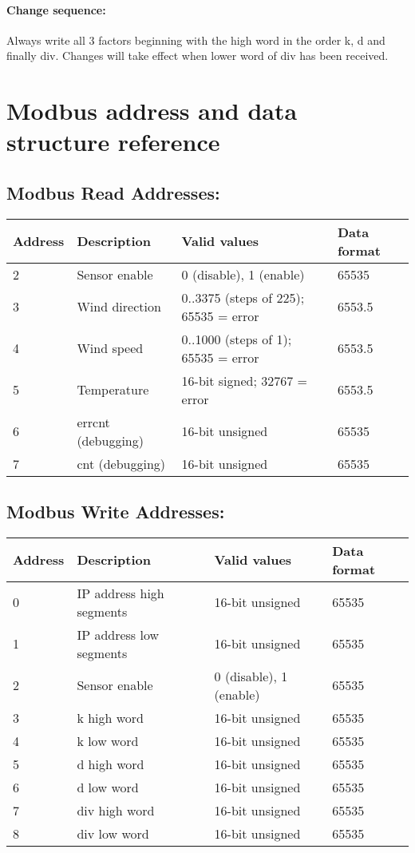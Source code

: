 \paragraph{Change sequence: }Always write all 3 factors beginning with the high word in the order k, d and finally div. Changes will take effect when lower word of div has been received.

\section{Modbus address and data structure reference}
\label{sec:modbus_address_ref}
\subsection{Modbus Read Addresses:}

\begin{tabular}{|l|l|l|l|}
\hline \textbf{Address} & \textbf{Description} & \textbf{Valid values} & \textbf{Data format} \\ 
\hline
\hline 2 & Sensor enable & 0 (disable), 1 (enable) & 65535 \\ 
\hline 3 & Wind direction & 0..3375 (steps of 225); 65535 = error & 6553.5 \\ 
\hline 4 & Wind speed & 0..1000 (steps of 1); 65535 = error & 6553.5 \\ 
\hline 5 & Temperature & 16-bit signed; 32767 = error & 6553.5 \\ 
\hline 6 & errcnt (debugging) & 16-bit unsigned & 65535 \\ 
\hline 7 & cnt (debugging) & 16-bit unsigned & 65535 \\ 
\hline 
\end{tabular} 

\subsection{Modbus Write Addresses:}

\begin{tabular}{|l|l|l|l|}
\hline \textbf{Address} & \textbf{Description} & \textbf{Valid values} & \textbf{Data format} \\ 
\hline
\hline 0 & IP address high segments & 16-bit unsigned & 65535 \\ 
\hline 1 & IP address low segments & 16-bit unsigned & 65535 \\ 
\hline 2 & Sensor enable & 0 (disable), 1 (enable) & 65535 \\ 
\hline 3 & k high word & 16-bit unsigned & 65535 \\ 
\hline 4 & k low word & 16-bit unsigned & 65535 \\ 
\hline 5 & d high word & 16-bit unsigned & 65535 \\ 
\hline 6 & d low word & 16-bit unsigned & 65535 \\ 
\hline 7 & div high word & 16-bit unsigned & 65535 \\ 
\hline 8 & div low word & 16-bit unsigned & 65535 \\ 
\hline 
\end{tabular} 
